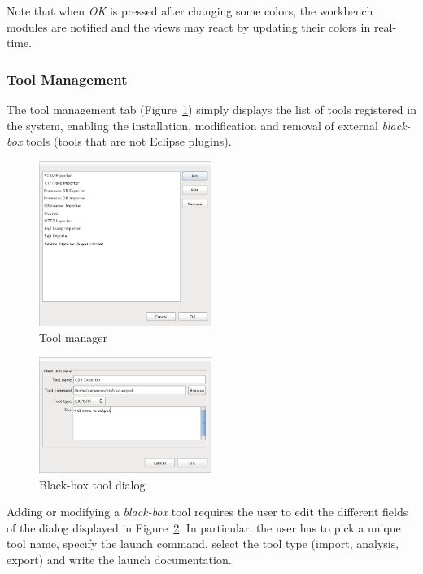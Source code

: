 \documentclass[twoside]{article}
\begin{document}
\begin{sloppypar}
Note that when \emph{OK} is pressed after changing some colors, the workbench modules are notified and the views may react by updating their colors in real-time.


\subsubsection{Tool Management}
\label{subsec:tools}

The tool management tab (Figure~\ref{fig:manage_tools}) simply displays the list of tools registered in the system, 
enabling the installation, modification and removal of external \emph{black-box} tools (tools that are not Eclipse plugins).

\begin{figure}[h!]
  \centering
    \includegraphics[width=0.5\textwidth]{images/manage_tools.png}
  \caption{Tool manager}
  \label{fig:manage_tools}
\end{figure}

\begin{figure}[h!]
  \centering
    \includegraphics[width=0.5\textwidth]{images/blackbox.png}
  \caption{Black-box tool dialog}
  \label{fig:blackbox}
\end{figure}

Adding or modifying a \emph{black-box} tool requires the user to edit the different fields of the dialog displayed in Figure~\ref{fig:blackbox}.
In particular, the user has to pick a unique tool name, specify the launch command, select the tool type (import, analysis, export) and write the launch documentation.


\end{sloppypar}
\end{document}

